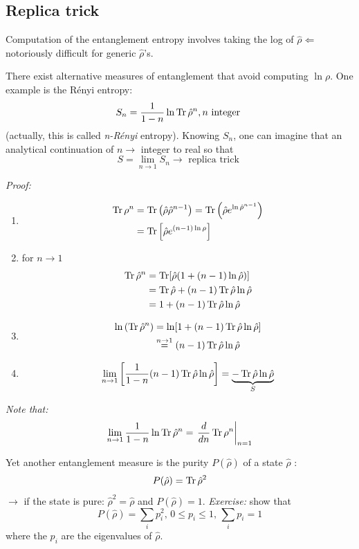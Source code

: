\documentclass[12pt]{article}
\newcommand{\be}{\begin{equation}}
\newcommand{\ee}{\end{equation}}
\begin{document}
\subsection{Replica trick}

Computation of the entanglement entropy involves
taking the log of \(\hat{\rho} \Leftarrow\) notoriously difficult
for generic \(\hat{\rho}\)'s.

There exist alternative measures of entanglement
that avoid computing  \(\ln \rho\). One example is
the Rényi entropy:
\be
S_{n}=\frac{1}{1-n} \ln \Tr \hat{\rho}^n, n \text { integer }
\ee
(actually, this is called \emph{n-Rényi} entropy).
Knowing $S_n$, one can imagine that an analytical
continuation of \(n \rightarrow\) integer to real so that
\be
S=\lim _{n \rightarrow 1} S_{n} \rightarrow \text{ replica trick }
\ee

\emph{Proof:}
\begin{enumerate}
\item
\be
\begin{aligned} \Tr \rho^{n} 
&=\Tr\left(\hat{\rho} \hat{\rho}^{n-1}\right)
 =\Tr\left(\hat{\rho} e^{\ln \hat{\rho}^{n-1}}\right) \\ 
&=\Tr\left[\hat{\rho} e^{(n-1) \ln \rho}\right] \end{aligned}
\ee
\item for \(n \rightarrow 1\)
\be
\begin{aligned}
\Tr \hat{\rho}^{n}
&=\Tr[\hat{\rho}(1+(n-1) \ln \hat{\rho})]\\
&=\Tr \hat{\rho}+(n-1) \Tr \hat{\rho} \ln \hat{\rho}\\
&=1+(n-1) \Tr \hat{\rho} \ln \hat{\rho}
\end{aligned}
\ee
\item
\be
\begin{aligned} 
\ln \left(\Tr \hat{\rho}^{n}\right) 
&=\ln [1+(n-1) \Tr \hat{\rho} \ln \hat{\rho}] \\ 
&\stackrel{n\to1}{=}(n-1) \Tr \hat{\rho} \ln \hat{\rho} \end{aligned}
\ee
\item
\be
\lim _{n \rightarrow 1}\left[\frac{1}{1-n}(n-1) \Tr \hat{\rho} \ln \hat{\rho}\right]=\underbrace{-\Tr \hat{\rho} \ln \hat{\rho}}_{S}
\ee
\end{enumerate}
\emph{Note that:}
\be
\lim _{n \rightarrow 1} \frac{1}{1-n} \ln \Tr \hat{\rho}^{n}=\left.\frac{d}{d n} \Tr \rho^{n}\right|_{n=1}
\ee

Yet another entanglement measure is the purity
\(P(\hat{\rho})\) of a state \(\hat{\rho}\) :
\be
P(\hat{\rho})=\Tr \hat{\rho}^{2}
\ee
$\rightarrow$ if the state is pure: $\hat{\rho}^2 = \hat{\rho}$ and $P(\hat{\rho}) = 1$.
\emph{Exercise:} show that
\be
P(\hat{\rho})=\sum_{i} p_{i}^{2},\,0 \leqslant p_{i} \leqslant 1,\, \sum_{i} p_{i}=1
\ee
where the $p_i$ are the eigenvalues of $\hat{\rho}$.
\end{document}
